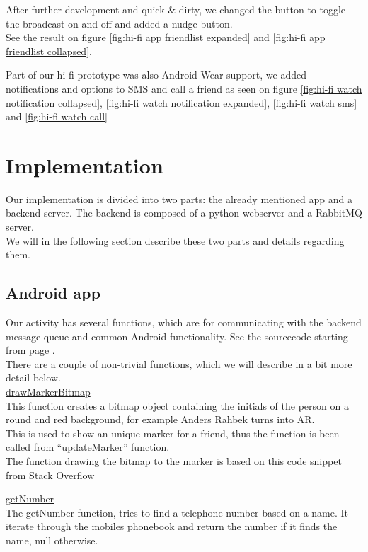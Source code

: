 \documentclass[runningheads,a4paper]{llncs}
\begin{document}
After further development and quick \& dirty, we changed the button to toggle the broadcast on and off and added a nudge button. \\
See the result on figure \ref{fig:hi-fi app friendlist expanded} and \ref{fig:hi-fi app friendlist collapsed}. 

Part of our hi-fi prototype was also Android Wear support, we added notifications and options to SMS and call a friend as seen on figure \ref{fig:hi-fi watch notification collapsed}, \ref{fig:hi-fi watch notification expanded}, \ref{fig:hi-fi watch sms} and \ref{fig:hi-fi watch call}

\section{Implementation}
Our implementation is divided into two parts: the already mentioned app and a backend server. The backend is composed of a python webserver and a RabbitMQ server\cite{rabbitmq}. \\
We will in the following section describe these two parts and details regarding them. 

\subsection{Android app}
Our activity has several functions, which are for communicating with the backend message-queue and common Android functionality. See the sourcecode starting from page \pageref{source-code}. \\
There are a couple of non-trivial functions, which we will describe in a bit more detail below.\\

\underline{drawMarkerBitmap}\\
This function creates a bitmap object containing the initials of the person on a round and red background, for example Anders Rahbek turns into AR.\\

This is used to show an unique marker for a friend, thus the function is been called from “updateMarker” function. \\
The function drawing the bitmap to the marker is based on this code snippet from Stack Overflow\cite{bitmapstackoverflow}

\underline{getNumber}\\
The getNumber function, tries to find a telephone number based on a name. It iterate through the mobiles phonebook and return the number if it finds the name, null otherwise. \\
\end{document}
